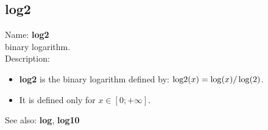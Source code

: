 \subsection{ log2 }
\noindent Name: \textbf{log2}\\
binary logarithm.\\

\noindent Description: \begin{itemize}

\item \textbf{log2} is the binary logarithm defined by: ${\rm log2}(x) = \log(x)/\log(2)$.

\item It is defined only for $x \in [0; +\infty]$.
\end{itemize}
See also: \textbf{log}, \textbf{log10}

